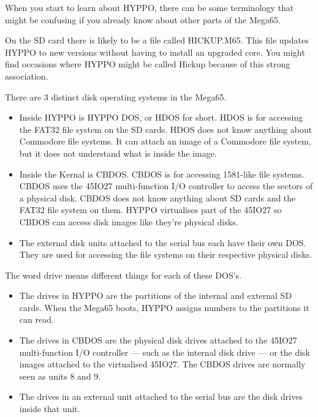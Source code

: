 When you start to learn about HYPPO, there can be some terminology that might be
confusing if you already know about other parts of the Mega65.

On the SD card there is likely to be a file called HICKUP.M65. This file updates
HYPPO to new versions without having to install an upgraded core. You might find
occasions where HYPPO might be called Hickup because of this strong association.

There are 3 distinct disk operating systems in the Mega65.

\begin{itemize}
  \item Inside HYPPO is HYPPO DOS, or HDOS for short. HDOS is for accessing
        the FAT32 file system on the SD cards. HDOS does not know anything
        about Commodore file systems. It can attach an image of a Commodore
        file system, but it does not understand what is inside the image.
  \item Inside the Kernal is CBDOS. CBDOS is for accessing 1581-like file
        systems. CBDOS uses the 45IO27 multi-function I/O controller to access
        the sectors of a physical disk. CBDOS does not know anything about SD
        cards and the FAT32 file system on them. HYPPO virtualises part of the
        45IO27 so CBDOS can access disk images like they're physical disks.
  \item The external disk units attached to the serial bus each have their own
        DOS. They are used for accessing the file systems on their respective
        physical disks.
\end{itemize}

The word drive means different things for each of these DOS's.

\begin{itemize}
  \item The drives in HYPPO are the partitions of the internal and external SD
        cards. When the Mega65 boots, HYPPO assigns numbers to the partitions
        it can read.
  \item The drives in CBDOS are the physical disk drives attached to the 45IO27
        multi-function I/O controller --- such as the internal disk drive ---
        or the disk images attached to the virtualised 45IO27. The CBDOS drives
        are normally seen as units 8 and 9.
  \item The drives in an external unit attached to the serial bus are the
        disk drives inside that unit.
\end{itemize}

